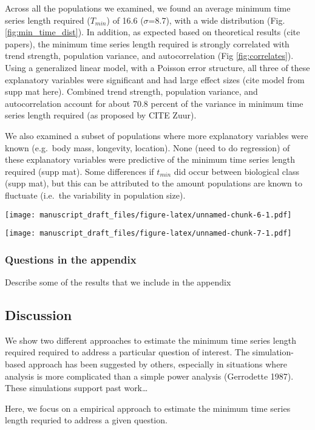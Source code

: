\documentclass[12pt,]{article}
\begin{document}
Across all the populations we examined, we found an average minimum time
series length required (\(T_{min}\)) of 16.6 (\(\sigma\)=8.7), with a
wide distribution (Fig. \ref{fig:min_time_dist}). In addition, as
expected based on theoretical results (cite papers), the minimum time
series length required is strongly correlated with trend strength,
population variance, and autocorrelation (Fig \ref{fig:correlates}).
Using a generalized linear model, with a Poisson error structure, all
three of these explanatory variables were significant and had large
effect sizes (cite model from supp mat here). Combined trend strength,
population variance, and autocorrelation account for about 70.8 percent
of the variance in minimum time series length required (as proposed by
CITE Zuur).

We also examined a subset of populations where more explanatory
variables were known (e.g.~body mass, longevity, location). None (need
to do regression) of these explanatory variables were predictive of the
minimum time series length required (supp mat). Some differences if
\(t_{min}\) did occur between biological class (supp mat), but this can
be attributed to the amount populations are known to fluctuate (i.e.~the
variability in population size).

\texttt{[image: manuscript\_draft\_files/figure-latex/unnamed-chunk-6-1.pdf]}

\texttt{[image: manuscript\_draft\_files/figure-latex/unnamed-chunk-7-1.pdf]}

\subsubsection{Questions in the
appendix}\label{questions-in-the-appendix}

Describe some of the results that we include in the appendix

\subsection{Discussion}\label{discussion}

We show two different approaches to estimate the minimum time series
length required required to address a particular question of interest.
The simulation-based approach has been suggested by others, especially
in situations where analysis is more complicated than a simple power
analysis (Gerrodette 1987). These simulations support past work\ldots{}

Here, we focus on a empirical approach to estimate the minimum time
series length requried to address a given question.
\end{document}
